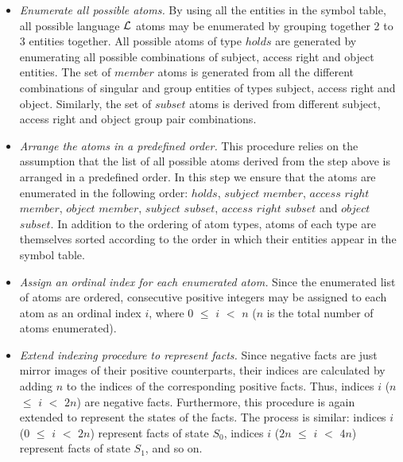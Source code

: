 \documentclass[global,twocolumn,draft]{svjour}
\begin{document}
          \begin{itemize}

            \item
              {\em Enumerate all possible atoms.}
              By using all the entities in the symbol table, all possible
              language ${\cal L}$ atoms may be enumerated by grouping together
              2 to 3 entities together. All possible atoms of type $holds$ are
              generated by enumerating all possible combinations of subject,
              access right and object entities. The set of $member$ atoms is
              generated from all the different combinations of singular and
              group entities of types subject, access right and object.
              Similarly, the set of $subset$ atoms is derived from different
              subject, access right and object group pair combinations.

            \item
              {\em Arrange the atoms in a predefined order.}
              This procedure relies on the assumption that the list of all
              possible atoms derived from the step above is arranged in a
              predefined order. In this step we ensure that the atoms are
              enumerated in the following order: $holds$, $subject$ $member$,
              $access$ $right$ $member$, $object$ $member$, $subject$
              $subset$, $access$ $right$ $subset$ and $object$ $subset$. In
              addition to the ordering of atom types, atoms of each type are
              themselves sorted according to the order in which their entities
              appear in the symbol table.

            \item
              {\em Assign an ordinal index for each enumerated atom.}
              Since the enumerated list of atoms are ordered, consecutive
              positive integers may be assigned to each atom as an ordinal
              index $i$, where $0$ $\leq$ $i$ $<$ $n$ ($n$ is the total
              number of atoms enumerated).

            \item
              {\em Extend indexing procedure to represent facts.} Since
              negative facts are just mirror images of their positive
              counterparts, their indices are calculated by adding $n$ to the
              indices of the corresponding positive facts. Thus, indices $i$
              ($n$ $\leq$ $i$ $<$ $2n$) are negative facts. Furthermore, this
              procedure is again extended to represent the states of the
              facts. The process is similar: indices $i$ ($0$ $\leq$ $i$ $<$
              $2n$) represent facts of state $S_{0}$, indices $i$ ($2n$ $\leq$
              $i$ $<$ $4n$) represent facts of state $S_{1}$, and so on.
          \end{itemize}
\end{document}
